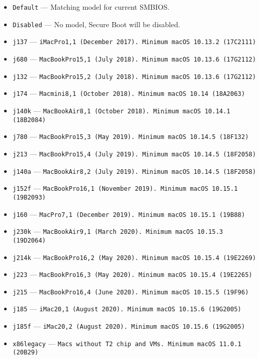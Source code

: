 \documentclass[]{article}
\providecommand{\tightlist}{%
  \setlength{\itemsep}{0pt}\setlength{\parskip}{0pt}}
\begin{document}
\begin{enumerate}
  \begin{itemize}
  \tightlist
  \item \texttt{Default} --- Matching model for current SMBIOS.
  \item \texttt{Disabled} --- No model, Secure Boot will be disabled.
  \item \texttt{j137} --- \texttt{iMacPro1,1 (December 2017). Minimum macOS 10.13.2 (17C2111)}
  \item \texttt{j680} --- \texttt{MacBookPro15,1 (July 2018). Minimum macOS 10.13.6 (17G2112)}
  \item \texttt{j132} --- \texttt{MacBookPro15,2 (July 2018). Minimum macOS 10.13.6 (17G2112)}
  \item \texttt{j174} --- \texttt{Macmini8,1 (October 2018). Minimum macOS 10.14 (18A2063)}
  \item \texttt{j140k} --- \texttt{MacBookAir8,1 (October 2018). Minimum macOS 10.14.1 (18B2084)}
  \item \texttt{j780} --- \texttt{MacBookPro15,3 (May 2019). Minimum macOS 10.14.5 (18F132)}
  \item \texttt{j213} --- \texttt{MacBookPro15,4 (July 2019). Minimum macOS 10.14.5 (18F2058)}
  \item \texttt{j140a} --- \texttt{MacBookAir8,2 (July 2019). Minimum macOS 10.14.5 (18F2058)}
  \item \texttt{j152f} --- \texttt{MacBookPro16,1 (November 2019). Minimum macOS 10.15.1 (19B2093)}
  \item \texttt{j160} --- \texttt{MacPro7,1 (December 2019). Minimum macOS 10.15.1 (19B88)}
  \item \texttt{j230k} --- \texttt{MacBookAir9,1 (March 2020). Minimum macOS 10.15.3 (19D2064)}
  \item \texttt{j214k} --- \texttt{MacBookPro16,2 (May 2020). Minimum macOS 10.15.4 (19E2269)}
  \item \texttt{j223} --- \texttt{MacBookPro16,3 (May 2020). Minimum macOS 10.15.4 (19E2265)}
  \item \texttt{j215} --- \texttt{MacBookPro16,4 (June 2020). Minimum macOS 10.15.5 (19F96)}
  \item \texttt{j185} --- \texttt{iMac20,1 (August 2020). Minimum macOS 10.15.6 (19G2005)}
  \item \texttt{j185f} --- \texttt{iMac20,2 (August 2020). Minimum macOS 10.15.6 (19G2005)}
  \item \texttt{x86legacy} --- \texttt{Macs without T2 chip and VMs. Minimum macOS 11.0.1 (20B29)}
  \end{itemize}


\end{enumerate}
\end{document}

